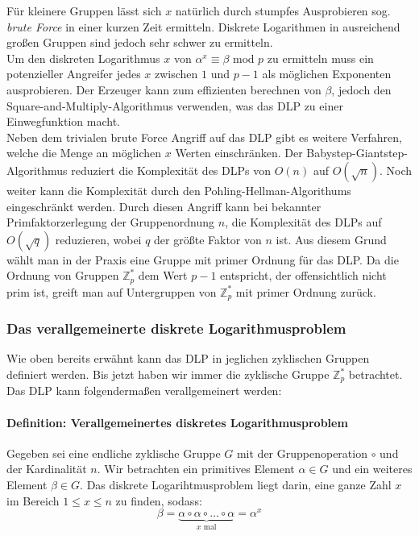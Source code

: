 Für kleinere Gruppen lässt sich $x$ natürlich durch stumpfes Ausprobieren sog. \textit{brute Force} in einer kurzen Zeit ermitteln. Diskrete Logarithmen in ausreichend großen Gruppen sind jedoch sehr schwer zu ermitteln.\\

Um den diskreten Logarithmus $x$ von $\alpha^x \equiv \beta \text{ mod } p$ zu ermitteln muss ein potenzieller Angreifer jedes $x$ zwischen $1$ und $p-1$ als möglichen Exponenten ausprobieren. Der Erzeuger kann zum effizienten berechnen von $\beta$, jedoch den Square-and-Multiply-Algorithmus verwenden, was das DLP zu einer Einwegfunktion macht.\\

Neben dem trivialen brute Force Angriff auf das DLP gibt es weitere Verfahren, welche die Menge an möglichen $x$ Werten einschränken. Der Babystep-Giantstep-Algorithmus reduziert die Komplexität des DLPs von $O(n)$ auf $O(\sqrt{n})$. Noch weiter kann die Komplexität durch den Pohling-Hellman-Algorithums eingeschränkt werden. Durch diesen Angriff kann bei bekannter Primfaktorzerlegung der Gruppenordnung $n$, die Komplexität des DLPs auf $O(\sqrt{q})$ reduzieren, wobei $q$ der größte Faktor von $n$ ist. Aus diesem Grund wählt man in der Praxis eine Gruppe mit primer Ordnung für das DLP. Da die Ordnung von Gruppen $\mathbb{Z}^*_p$ dem Wert $p-1$ entspricht, der offensichtlich nicht prim ist, greift man auf Untergruppen von $\mathbb{Z}^*_p$ mit primer Ordnung zurück.\cite{Paar.2016}

\subsubsection{Das verallgemeinerte diskrete Logarithmusproblem}
Wie oben bereits erwähnt kann das DLP in jeglichen zyklischen Gruppen definiert werden. Bis jetzt haben wir immer die zyklische Gruppe $\mathbb{Z}^*_p$ betrachtet. Das DLP kann folgendermaßen verallgemeinert werden:

\paragraph{Definition: Verallgemeinertes diskretes Logarithmusproblem}
Gegeben sei eine endliche zyklische Gruppe $G$ mit der Gruppenoperation $\circ$ und der Kardinalität $n$. Wir betrachten ein primitives Element $\alpha \in G$ und ein weiteres Element $\beta \in G$. Das diskrete Logarihtmusproblem liegt darin, eine ganze Zahl $x$ im Bereich $1 \leq x \leq n$ zu finden, sodass:
$$\beta = \underbrace{\alpha \circ \alpha \circ \dots \circ \alpha}_{\text{$x$ mal}} = \alpha^x$$\\

